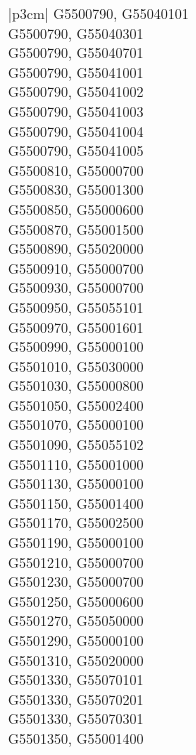 \begin{customLongTable}{ |p{3cm}| }
G5500790, G55040101 \\ \hline
G5500790, G55040301 \\ \hline
G5500790, G55040701 \\ \hline
G5500790, G55041001 \\ \hline
G5500790, G55041002 \\ \hline
G5500790, G55041003 \\ \hline
G5500790, G55041004 \\ \hline
G5500790, G55041005 \\ \hline
G5500810, G55000700 \\ \hline
G5500830, G55001300 \\ \hline
G5500850, G55000600 \\ \hline
G5500870, G55001500 \\ \hline
G5500890, G55020000 \\ \hline
G5500910, G55000700 \\ \hline
G5500930, G55000700 \\ \hline
G5500950, G55055101 \\ \hline
G5500970, G55001601 \\ \hline
G5500990, G55000100 \\ \hline
G5501010, G55030000 \\ \hline
G5501030, G55000800 \\ \hline
G5501050, G55002400 \\ \hline
G5501070, G55000100 \\ \hline
G5501090, G55055102 \\ \hline
G5501110, G55001000 \\ \hline
G5501130, G55000100 \\ \hline
G5501150, G55001400 \\ \hline
G5501170, G55002500 \\ \hline
G5501190, G55000100 \\ \hline
G5501210, G55000700 \\ \hline
G5501230, G55000700 \\ \hline
G5501250, G55000600 \\ \hline
G5501270, G55050000 \\ \hline
G5501290, G55000100 \\ \hline
G5501310, G55020000 \\ \hline
G5501330, G55070101 \\ \hline
G5501330, G55070201 \\ \hline
G5501330, G55070301 \\ \hline
G5501350, G55001400 \\ \hline

\end{customLongTable}
